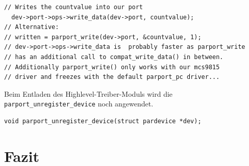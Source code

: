 \documentclass[a4paper,11pt]{article}
\begin{document}
\begin{verbatim}
// Writes the countvalue into our port
  dev->port->ops->write_data(dev->port, countvalue);
// Alternative:
// written = parport_write(dev->port, &countvalue, 1);
// dev->port->ops->write_data is  probably faster as parport_write 
// has an additional call to compat_write_data() in between. 
// Additionally parport_write() only works with our mcs9815 
// driver and freezes with the default parport_pc driver...
\end{verbatim}
\noindent
Beim Entladen des Highlevel-Treiber-Moduls wird die \verb|parport_unregister_device| noch angewendet.

\begin{verbatim}
void parport_unregister_device(struct pardevice *dev);
\end{verbatim}

\section{Fazit}
\end{document}
